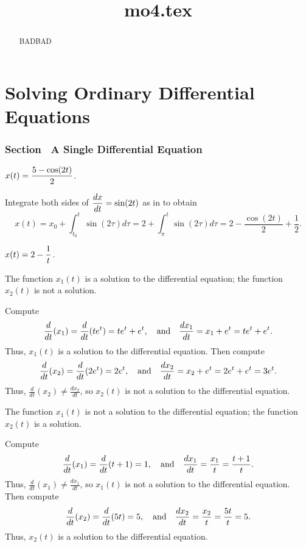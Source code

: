\documentclass{ximera}
\title{mo4.tex}
\begin{document}
\begin{abstract}
BADBAD
\end{abstract}
\maketitle

\chapter{Solving Ordinary Differential Equations}

\subsection*{Section~\protect{\ref{S:growthmodels}} A Single Differential
Equation}

\ans $\displaystyle x(t) = \frac{5 - \cos(2t)}{2}$.

\soln Integrate both sides of $\displaystyle\frac{dx}{dt} = \sin(2t)$ as in
 to obtain
\[
x(t) = x_0 + \int_{t_0}^{t}\sin(2\tau)d\tau =
2 + \int_{\pi}^{t}\sin(2\tau)d\tau = 2 - \frac{\cos(2t)}{2} +
\frac{1}{2}.
\]

 $\displaystyle x(t) = 2 - \frac{1}{t}$.

\ans The function $x_1(t)$ is a solution to the differential equation;
the function $x_2(t)$ is not a solution.

\soln Compute
\[
\frac{d}{dt}(x_1) = \frac{d}{dt}(te^t) = te^t + e^t, \quad\mbox{and}\quad
\frac{dx_1}{dt} = x_1 + e^t = te^t + e^t.
\]
Thus, $x_1(t)$ is a solution to the differential equation.  Then compute
\[
\frac{d}{dt}(x_2) = \frac{d}{dt}(2e^t) = 2e^t, \quad\mbox{and}\quad
\frac{dx_2}{dt} = x_2 + e^t = 2e^t + e^t = 3e^t.
\]
Thus, $\frac{d}{dt}(x_2) \neq \frac{dx_2}{dt}$, so $x_2(t)$ is not a
solution to the differential equation.

\ans The function $x_1(t)$ is not a solution to the differential equation;
the function $x_2(t)$ is a solution.

\soln Compute
\[
\frac{d}{dt}(x_1) = \frac{d}{dt}(t + 1) = 1, \quad\mbox{and}\quad
\frac{dx_1}{dt} = \frac{x_1}{t} = \frac{t + 1}{t}.
\]
Thus, $\frac{d}{dt}(x_1) \neq \frac{dx_1}{dt}$, so $x_1(t)$ is not a
solution to the differential equation.  Then compute
\[
\frac{d}{dt}(x_2) = \frac{d}{dt}(5t) = 5, \quad\mbox{and}\quad
\frac{dx_2}{dt} = \frac{x_2}{t} = \frac{5t}{t} = 5.
\]
Thus, $x_2(t)$ is a solution to the differential equation.
\end{document}
